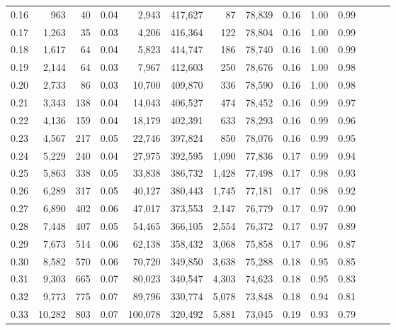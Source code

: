 \begin{tabular}{rrrrrrrrrrrrrr}
0.16 &     963 &     40 &  0.04 &    2,943 &  417,627 &      87 &  78,839 &  0.16 &  1.00 &      0.99 \\
0.17 &   1,263 &     35 &  0.03 &    4,206 &  416,364 &     122 &  78,804 &  0.16 &  1.00 &      0.99 \\
0.18 &   1,617 &     64 &  0.04 &    5,823 &  414,747 &     186 &  78,740 &  0.16 &  1.00 &      0.99 \\
0.19 &   2,144 &     64 &  0.03 &    7,967 &  412,603 &     250 &  78,676 &  0.16 &  1.00 &      0.98 \\
0.20 &   2,733 &     86 &  0.03 &   10,700 &  409,870 &     336 &  78,590 &  0.16 &  1.00 &      0.98 \\
0.21 &   3,343 &    138 &  0.04 &   14,043 &  406,527 &     474 &  78,452 &  0.16 &  0.99 &      0.97 \\
0.22 &   4,136 &    159 &  0.04 &   18,179 &  402,391 &     633 &  78,293 &  0.16 &  0.99 &      0.96 \\
0.23 &   4,567 &    217 &  0.05 &   22,746 &  397,824 &     850 &  78,076 &  0.16 &  0.99 &      0.95 \\
0.24 &   5,229 &    240 &  0.04 &   27,975 &  392,595 &   1,090 &  77,836 &  0.17 &  0.99 &      0.94 \\
0.25 &   5,863 &    338 &  0.05 &   33,838 &  386,732 &   1,428 &  77,498 &  0.17 &  0.98 &      0.93 \\
0.26 &   6,289 &    317 &  0.05 &   40,127 &  380,443 &   1,745 &  77,181 &  0.17 &  0.98 &      0.92 \\
0.27 &   6,890 &    402 &  0.06 &   47,017 &  373,553 &   2,147 &  76,779 &  0.17 &  0.97 &      0.90 \\
0.28 &   7,448 &    407 &  0.05 &   54,465 &  366,105 &   2,554 &  76,372 &  0.17 &  0.97 &      0.89 \\
0.29 &   7,673 &    514 &  0.06 &   62,138 &  358,432 &   3,068 &  75,858 &  0.17 &  0.96 &      0.87 \\
0.30 &   8,582 &    570 &  0.06 &   70,720 &  349,850 &   3,638 &  75,288 &  0.18 &  0.95 &      0.85 \\
0.31 &   9,303 &    665 &  0.07 &   80,023 &  340,547 &   4,303 &  74,623 &  0.18 &  0.95 &      0.83 \\
0.32 &   9,773 &    775 &  0.07 &   89,796 &  330,774 &   5,078 &  73,848 &  0.18 &  0.94 &      0.81 \\
0.33 &  10,282 &    803 &  0.07 &  100,078 &  320,492 &   5,881 &  73,045 &  0.19 &  0.93 &      0.79 \\

\end{tabular}
